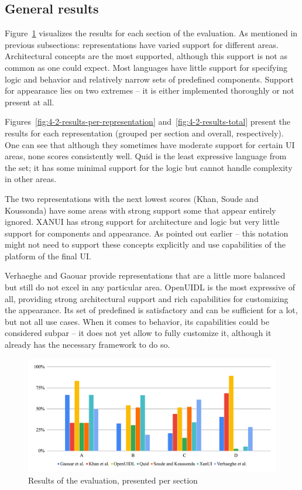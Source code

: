\subsection{General results}\label{subsec:general-results}

Figure~\ref{fig:4-2-results-per-section} visualizes the results for each section of the evaluation.
As mentioned in previous subsections: representations have varied support for different areas.
Architectural concepts are the most supported, although this support is not as common as one could expect.
Most languages have little support for specifying logic and behavior and relatively narrow sets of predefined components.
Support for appearance lies on two extremes -- it is either implemented thoroughly or not present at all.

Figures~\ref{fig:4-2-results-per-representation} and~\ref{fig:4-2-results-total} present the results for each representation (grouped per section and overall, respectively).
One can see that although they sometimes have moderate support for certain UI areas, none scores consistently well.
Quid is the least expressive language from the set;
it has some minimal support for the logic but cannot handle complexity in other areas.

The two representations with the next lowest scores (Khan, Soude and Koussonda) have some areas with strong support some that appear entirely ignored.
XANUI has strong support for architecture and logic but very little support for components and appearance.
As pointed out earlier -- this notation might not need to support these concepts explicitly and use capabilities of the platform of the final UI\@.

Verhaeghe and Gaouar provide representations that are a little more balanced but still do not excel in any particular area.
OpenUIDL is the most expressive of all, providing strong architectural support and rich capabilities for customizing the appearance.
Its set of predefined is satisfactory and can be sufficient for a lot, but not all use cases.
When it comes to behavior, its capabilities could be considered subpar -- it does not yet allow to fully customize it, although it already has the necessary framework to do so.

\begin{figure}
    \centering
    \includegraphics[width=\textwidth]{4-results-and-discussion/results-per-section}
    \caption{Results of the evaluation, presented per section}
    \label{fig:4-2-results-per-section}
\end{figure}

